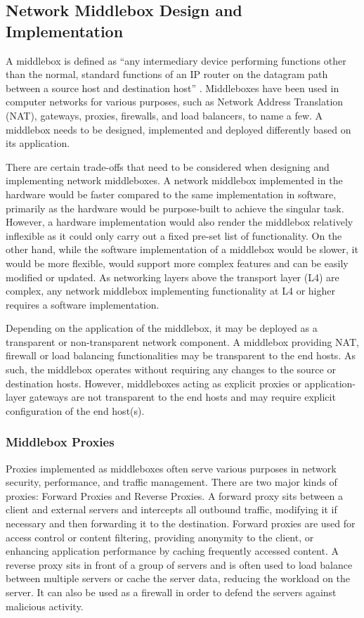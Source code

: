 \subsection{Network Middlebox Design and Implementation}
\label{subsec:netshaper-background-network-middlebox-designs}

A middlebox is defined as ``any intermediary device performing functions other than the normal, standard functions of an IP router on the datagram path between a source host and destination host'' \cite{rfc3234middleboxes}.
Middleboxes have been used in computer networks for various purposes, such as Network Address Translation (NAT), gateways, proxies, firewalls, and load balancers, to name a few.
A middlebox needs to be designed, implemented and deployed differently based on its application.

There are certain trade-offs that need to be considered when designing and implementing network middleboxes.
A network middlebox implemented in the hardware would be faster compared to the same implementation in software, primarily as the hardware would be purpose-built to achieve the singular task.
However, a hardware implementation would also render the middlebox relatively inflexible as it could only carry out a fixed pre-set list of functionality.
On the other hand, while the software implementation of a middlebox would be slower, it would be more flexible, would support more complex features and can be easily modified or updated.
As networking layers above the transport layer (L4) are complex, any network middlebox implementing functionality at L4 or higher requires a software implementation.

Depending on the application of the middlebox, it may be deployed as a transparent or non-transparent network component.
A middlebox providing NAT, firewall or load balancing functionalities may be transparent to the end hosts.
As such, the middlebox operates without requiring any changes to the source or destination hosts.
However, middleboxes acting as explicit proxies or application-layer gateways are not transparent to the end hosts and may require explicit configuration of the end host(s).

\subsubsection{Middlebox Proxies}
\label{netshaper-background-middlebox-proxies}

Proxies implemented as middleboxes often serve various purposes in network security, performance, and traffic management.
There are two major kinds of proxies: Forward Proxies and Reverse Proxies.
A forward proxy sits between a client and external servers and intercepts all outbound traffic, modifying it if necessary and then forwarding it to the destination.
Forward proxies are used for access control or content filtering, providing anonymity to the client, or enhancing application performance by caching frequently accessed content.
A reverse proxy sits in front of a group of servers and is often used to load balance between multiple servers or cache the server data, reducing the workload on the server. 
It can also be used as a firewall in order to defend the servers against malicious activity.

